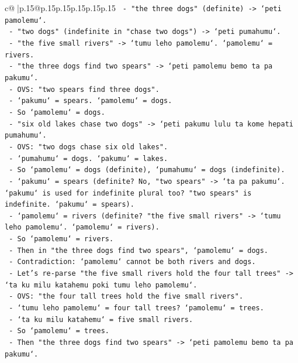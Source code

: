 \documentclass{article}
\begin{document}
{\begin{supertabular}{c@{$\;$}|p{.15\linewidth}@{}p{.15\linewidth}p{.15\linewidth}p{.15\linewidth}p{.15\linewidth}p{.15\linewidth}}
{{{\texttt{    {-} "the three dogs" (definite) {-}> `peti pamolemu`.} \\
\texttt{    {-} "two dogs" (indefinite in "chase two dogs") {-}> `peti pumahumu`.} \\
\texttt{    {-} "the five small rivers" {-}> `tumu leho pamolemu`. `pamolemu` = rivers.} \\
\texttt{    {-} "the three dogs find two spears" {-}> `peti pamolemu bemo ta pa pakumu`.} \\
\texttt{      {-} OVS: "two spears find three dogs".} \\
\texttt{      {-} `pakumu` = spears. `pamolemu` = dogs.} \\
\texttt{      {-} So `pamolemu` = dogs.} \\
\texttt{    {-} "six old lakes chase two dogs" {-}> `peti pakumu lulu ta kome hepati pumahumu`.} \\
\texttt{      {-} OVS: "two dogs chase six old lakes".} \\
\texttt{      {-} `pumahumu` = dogs. `pakumu` = lakes.} \\
\texttt{      {-} So `pamolemu` = dogs (definite), `pumahumu` = dogs (indefinite).} \\
\texttt{      {-} `pakumu` = spears (definite? No, "two spears" {-}> `ta pa pakumu`. `pakumu` is used for indefinite plural too? "two spears" is indefinite. `pakumu` = spears).} \\
\texttt{      {-} `pamolemu` = rivers (definite? "the five small rivers" {-}> `tumu leho pamolemu`. `pamolemu` = rivers).} \\
\texttt{      {-} So `pamolemu` = rivers.} \\
\texttt{      {-} Then in "the three dogs find two spears", `pamolemu` = dogs.} \\
\texttt{      {-} Contradiction: `pamolemu` cannot be both rivers and dogs.} \\
\texttt{      {-} Let's re{-}parse "the five small rivers hold the four tall trees" {-}> `ta ku milu katahemu poki tumu leho pamolemu`.} \\
\texttt{        {-} OVS: "the four tall trees hold the five small rivers".} \\
\texttt{        {-} `tumu leho pamolemu` = four tall trees? `pamolemu` = trees.} \\
\texttt{        {-} `ta ku milu katahemu` = five small rivers.} \\
\texttt{        {-} So `pamolemu` = trees.} \\
\texttt{        {-} Then "the three dogs find two spears" {-}> `peti pamolemu bemo ta pa pakumu`.} \\
}}}
\end{supertabular}}
\end{document}

